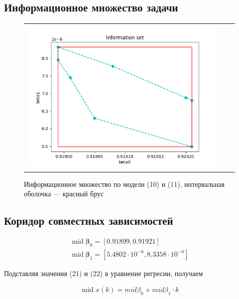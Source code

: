 \documentclass[a4paper,14pt]{article}
\DeclareMathOperator{\midd}{mid}
\begin{document}
	\subsection{Информационное множество задачи}
	\begin{figure}[H]
		\begin{center}
			\begin{tabular}{ccc}
				\includegraphics[scale=0.8]{../image/inform_set.png}
			\end{tabular}
		\end{center}
		\caption{Информационное множество по модели (10) и (11), интервальная оболочка — красный брус} 
	\end{figure}
	
	\subsection{Коридор совместных зависимостей}
	\begin{equation*}
		\begin{gathered}
			\midd \boldsymbol{\beta}_0 = [0.91899, 0.91921]\\
			\midd \boldsymbol{\beta}_1 = [5.4802 \cdot 10^{-6}, 8.3358 \cdot 10^{-6}]
		\end{gathered}
	\end{equation*}
	
	Подставляя значения (21) и (22) в уравнение регресии, получаем
	
	\begin{equation*}
		\begin{gathered}
			\midd x(k) = mid \beta_0 + mid \beta_1 \cdot k
		\end{gathered}
	\end{equation*}
\end{document}
